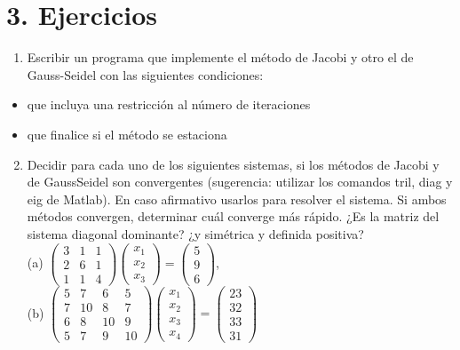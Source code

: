 \documentclass[10pt]{article}
\begin{document}
\section*{3. Ejercicios}
\begin{enumerate}
  \item Escribir un programa que implemente el método de Jacobi y otro el de Gauss-Seidel con las siguientes condiciones:
\end{enumerate}

\begin{itemize}
  \item que incluya una restricción al número de iteraciones
  \item que finalice si el método se estaciona
\end{itemize}

\begin{enumerate}
  \setcounter{enumi}{1}
  \item Decidir para cada uno de los siguientes sistemas, si los métodos de Jacobi y de GaussSeidel son convergentes (sugerencia: utilizar los comandos tril, diag y eig de Matlab). En caso afirmativo usarlos para resolver el sistema. Si ambos métodos convergen, determinar cuál converge más rápido. ¿Es la matriz del sistema diagonal dominante? ¿y simétrica y definida positiva?\\
(a) $\left(\begin{array}{lll}3 & 1 & 1 \\ 2 & 6 & 1 \\ 1 & 1 & 4\end{array}\right)\left(\begin{array}{l}x_{1} \\ x_{2} \\ x_{3}\end{array}\right)=\left(\begin{array}{l}5 \\ 9 \\ 6\end{array}\right)$,\\
(b) $\left(\begin{array}{cccc}5 & 7 & 6 & 5 \\ 7 & 10 & 8 & 7 \\ 6 & 8 & 10 & 9 \\ 5 & 7 & 9 & 10\end{array}\right)\left(\begin{array}{l}x_{1} \\ x_{2} \\ x_{3} \\ x_{4}\end{array}\right)=\left(\begin{array}{l}23 \\ 32 \\ 33 \\ 31\end{array}\right)$

\end{enumerate}
\end{document}
